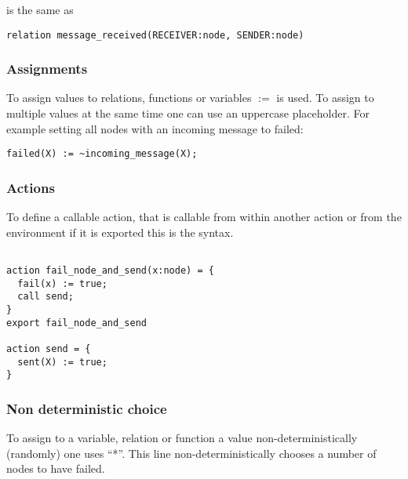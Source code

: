 \documentclass[fleqn]{article}
\begin{document}
\noindent is the same as

\begin{mdframed}[backgroundcolor=light-gray, roundcorner=10pt,leftmargin=1, rightmargin=1, innerleftmargin=15, innertopmargin=15,innerbottommargin=15, outerlinewidth=1, linecolor=light-gray]
\begin{lstlisting}
relation message_received(RECEIVER:node, SENDER:node)
\end{lstlisting}
\end{mdframed}

\subsubsection{Assignments}


To assign values to relations, functions or variables $:=$ is used. To assign to multiple values
at the same time one can use an uppercase placeholder. For example setting all nodes with an incoming message to failed:

\begin{mdframed}[backgroundcolor=light-gray, roundcorner=10pt,leftmargin=1, rightmargin=1, innerleftmargin=15, innertopmargin=15,innerbottommargin=15, outerlinewidth=1, linecolor=light-gray]
\begin{lstlisting}
failed(X) := ~incoming_message(X);
\end{lstlisting}
\end{mdframed}


\subsubsection{Actions}
To define a callable action, that is callable from within another action or from the environment if it is exported
this is the syntax.

\begin{mdframed}[backgroundcolor=light-gray, roundcorner=10pt,leftmargin=1, rightmargin=1, innerleftmargin=15, innertopmargin=15,innerbottommargin=15, outerlinewidth=1, linecolor=light-gray]
\begin{lstlisting}

action fail_node_and_send(x:node) = {
  fail(x) := true;
  call send;
}
export fail_node_and_send

action send = {
  sent(X) := true;
}
\end{lstlisting}
\end{mdframed}

\subsubsection{Non deterministic choice}
To assign to a variable, relation or function a value non-deterministically (randomly) one uses ``*''.
This line non-deterministically chooses a number of nodes to have failed.
\end{document}
